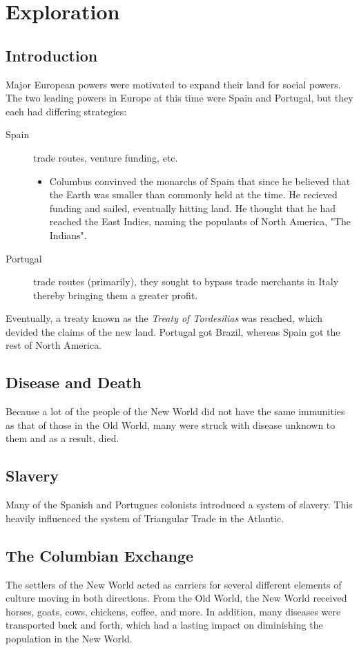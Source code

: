 \chapter{Exploration}
\section{Introduction}
Major European powers were motivated to expand their land for social powers.
The two leading powers in Europe at this time were Spain and Portugal, but they
each had differing strategies:

\begin{description}
  \item[Spain] trade routes, venture funding, etc.
    \begin{itemize}
      \item Columbus convinved the monarchs of Spain that since he believed that
        the Earth was smaller than commonly held at the time.  He recieved
        funding and sailed, eventually hitting land.  He thought that he had
        reached the East Indies, naming the populants of North America, "The
        Indians".
    \end{itemize}
  \item[Portugal] trade routes (primarily), they sought to bypass trade
    merchants in Italy thereby bringing them a greater profit.
\end{description}

Eventually, a treaty known as the \textit{Treaty of Tordesilias} was reached,
which devided the claims of the new land.  Portugal got Brazil, whereas Spain
got the rest of North America.

\section{Disease and Death}
Because a lot of the people of the New World did not have the same immunities as
that of those in the Old World, many were struck with disease unknown to them
and as a result, died.

\section{Slavery}
Many of the Spanish and Portugues colonists introduced a system of slavery.
This heavily influenced the system of Triangular Trade in the Atlantic.

\section{The Columbian Exchange}
The settlers of the New World acted as carriers for several different elements
of culture moving in both directions.  From the Old World, the New World
received horses, goats, cows, chickens, coffee, and more.  In addition, many
diseases were transported back and forth, which had a lasting impact on
diminishing the population in the New World.

